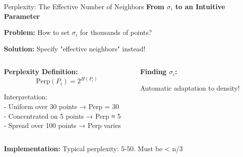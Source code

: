 \documentclass[10pt]{beamer}
\newcommand{\emphtext}[1]{\textcolor{upcblue}{\textbf{#1}}}
\newcommand{\warningbox}[1]{\colorbox{red!10}{\begin{minipage}{0.85\textwidth}\centering #1\end{minipage}}}
\begin{document}
\begin{frame}{Perplexity: The Effective Number of Neighbors}
\emphtext{From $\sigma_i$ to an Intuitive Parameter}

\vspace{0.3cm}
\textbf{Problem:} How to set $\sigma_i$ for thousands of points?

\textbf{Solution:} Specify "effective neighbors" instead!

\vspace{0.2cm}
\begin{columns}[T]
\begin{column}{0.48\textwidth}
\textbf{Perplexity Definition:}
$$\text{Perp}(P_i) = 2^{H(P_i)}$$

\footnotesize
Interpretation:\\
- Uniform over 30 points → Perp = 30\\
- Concentrated on 5 points → Perp ≈ 5\\
- Spread over 100 points → Perp varies
\end{column}

\begin{column}{0.48\textwidth}
\textbf{Finding $\sigma_i$:}

\footnotesize
Automatic adaptation to density!
\end{column}
\end{columns}

\vspace{0.3cm}
\begin{center}
\warningbox{\footnotesize\textbf{Implementation:} Typical perplexity: 5-50. Must be < n/3}
\end{center}
\end{frame}
\end{document}

